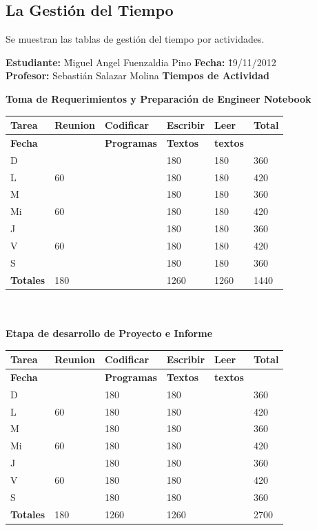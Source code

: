 \documentclass[a4paper,12pt,openany,oneside]{book}
\begin{document}
\subsection{La Gestión del Tiempo}
Se muestran las tablas de gestión del tiempo por actividades.

\begin{tabbing}
\textbf{Estudiante:} \= Miguel Angel Fuenzaldia Pino \= \textbf{Fecha:} \= 19/11/2012\\
\textbf{Profesor:} \> Sebastián Salazar Molina \> \textbf{Tiempos de Actividad} \>  \\
\end{tabbing}
\textbf{Toma de Requerimientos y Preparación de Engineer Notebook}\\
\begin{tabular}{| l | l | l | l | l | l |}
\hline
\textbf{Tarea} & \textbf{Reunion} & \textbf{Codificar} & \textbf{Escribir} & \textbf{Leer} & \textbf{Total} \\
\hline
\textbf{Fecha} &                  & \textbf{Programas} & \textbf{Textos} & \textbf{textos} & \\
\hline
D  &    & & 180 & 180 & 360 \\
\hline
L  & 60 & & 180 & 180 & 420 \\
\hline
M  &    & & 180 & 180 & 360 \\
\hline
Mi & 60 & & 180 & 180 & 420 \\
\hline
J  &    & & 180 & 180 & 360 \\
\hline
V  & 60 & & 180 & 180 & 420 \\
\hline
S  &    & & 180 & 180 & 360 \\
\hline
\textbf{Totales} & 180 & & 1260 & 1260 & 1440 \\
\hline
\end{tabular}
\\\\
\textbf{Etapa de desarrollo de Proyecto e Informe}\\
\begin{tabular}{| l | l | l | l | l | l |}
\hline
\textbf{Tarea} & \textbf{Reunion} & \textbf{Codificar} & \textbf{Escribir} & \textbf{Leer} & \textbf{Total} \\
\hline
\textbf{Fecha} &                  & \textbf{Programas} & \textbf{Textos} & \textbf{textos} & \\
\hline
D  &    & 180 & 180 &  & 360 \\
\hline
L  & 60 & 180 & 180 &  & 420 \\
\hline
M  &    & 180 & 180 &  & 360 \\
\hline
Mi & 60 & 180 & 180 &  & 420 \\
\hline
J  &    & 180 & 180 &  & 360 \\
\hline
V  & 60 & 180 & 180 &  & 420 \\
\hline
S  &    & 180 & 180 &  & 360 \\
\hline
\textbf{Totales} & 180 & 1260 & 1260 &  & 2700 \\
\hline
\end{tabular}
\end{document}
